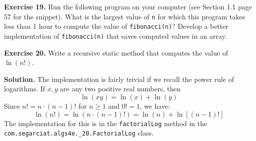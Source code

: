 \documentclass[12pt, a4paper]{article}
\newenvironment{ex}[2][Exercise]
{\par\medskip\noindent \textbf{#1 #2.}}
{\medskip}
\newenvironment{sol}[1][Solution]
{\par\medskip\noindent \textbf{#1.} }
{\medskip}
\begin{document}
	\begin{ex}{19}
		Run the following program on your computer (see Section 1.1 page 57 for the
		snippet). What is the largest value of \texttt{n} for which this program takes
		less than 1 hour to compute the value of \texttt{fibonacci(n)}? Develop a better
		implementation of \texttt{fibonacci(n)} that saves computed values in an array.
	\end{ex}
	\begin{ex}{20}
		Write a recursive static method that computes the value of $\ln (n!)$.
	\end{ex}
	\begin{sol}
		The implementation is fairly trivial if we recall the power rule of logarithms.
		If $x,y$ are any two positive real numbers, then
		\[
		\ln(xy) = \ln(x) + \ln(y)
		\]
		Since $n!=n\cdot (n-1)!$ for $n\geq 1$ and $0!=1$, we have:
		\[
		\ln(n!) = \ln(n\cdot (n-1)!) = \ln(n) + \ln[(n-1)!]
		\]
		The implementation for this is in the \texttt{factorialLog} method in the
		\texttt{\\com.segarciat.algs4e.\_20.FactorialLog} class.
	\end{sol}
	\pagebreak
	\printbibliography
\end{document}
